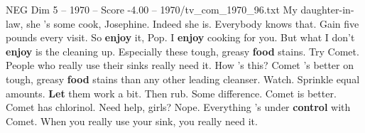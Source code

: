 \begin{textsample}{NEG Dim 5 – 1970 – Score -4.00 – 1970/tv\_com\_1970\_96.txt}  \label{ex:f5_neg_051}
My daughter-in-law, she 's some cook, Josephine.
Indeed she is.
Everybody knows that.
Gain five pounds every visit.
So \textbf{enjoy} it, Pop.
I \textbf{enjoy} cooking for you.
But what I don't \textbf{enjoy} is the cleaning up.
Especially these tough, greasy \textbf{food} stains.
Try Comet.
People who really use their sinks really need it.
How 's this?
Comet 's better on tough, greasy \textbf{food} stains than any other leading cleanser.
Watch.
Sprinkle equal amounts. \textbf{Let} them work a bit.
Then rub.
Some difference.
Comet is better.
Comet has chlorinol.
Need help, girls?
Nope.
Everything 's under \textbf{control} with Comet.
When you really use your sink, you really need it.

\end{textsample}
